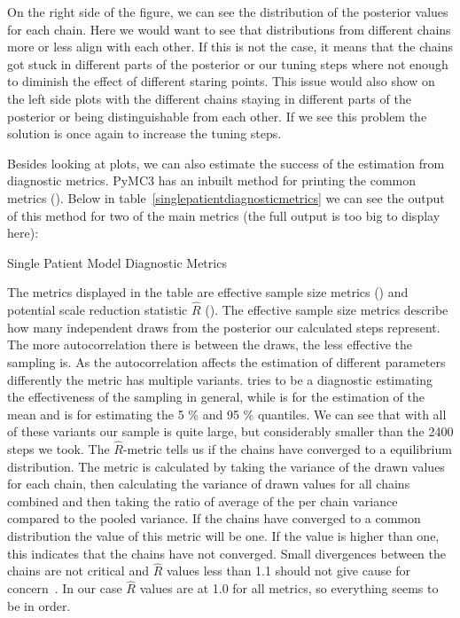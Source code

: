\documentclass[12pt,a4paper,leqno]{report}
\theoremstyle{plain}
\theoremstyle{definition}
\theoremstyle{remark}
\begin{document}
On the right side of the figure, we can see the distribution of the posterior values for
each chain. Here we
would want to see that distributions from different chains more or less align with
each other. If this is not the case, it means that the chains got stuck in different
parts of the posterior or our tuning steps where not enough to diminish the effect of
different staring points. This issue would also show on the left side plots with the different
chains staying in different parts of the posterior or being distinguishable from each
other. If we see this problem the solution is once again to increase the tuning steps.

Besides looking at plots, we can also estimate the success of the estimation from
diagnostic metrics. PyMC3 has an inbuilt method for printing the common metrics
(). Below in table\ \ref{singlepatientdiagnosticmetrics} we can see the output
of this method for two of the main metrics (the full output is too big to display here):

\bigskip
\begin{table}[H]
    \caption{Single Patient Model Diagnostic Metrics}\label{singlepatientdiagnosticmetrics}
    \bigskip
    \centering
    
\end{table}
\smallskip


The metrics displayed in the table are effective sample size metrics ()
and potential scale reduction statistic \(\hat{R}\) (). The effective sample
size metrics describe how many independent draws from the posterior our calculated steps
represent. The more autocorrelation there is between the draws, the less effective the
sampling is. As the autocorrelation affects the estimation of different parameters
differently the metric has multiple variants.  tries to be a
diagnostic estimating the effectiveness of the sampling in general\cite{essbulk},
while  is for the estimation of the mean and
 is for estimating the 5 \% and 95 \% quantiles. We can see that with all
of these variants our sample is quite large, but considerably smaller than the 2400
steps we took. The \(\hat{R}\)-metric
tells us if the chains have converged to a equilibrium distribution. The metric is calculated by
taking the variance of the drawn values for each chain,
then calculating the variance of drawn values for all chains combined and then taking the
ratio of average of the per chain variance compared to the pooled variance. If the
chains have converged to a common distribution the value of this metric will be one. If
the value is higher than one, this indicates that the chains have not converged. Small
divergences between the chains are not critical and \(\hat{R}\) values less than 1.1 should
not give cause for concern\ \cite{rhatrule}. In our case \(\hat{R}\) values are at 1.0 for
all metrics, so everything seems to be in order.
\end{document}

